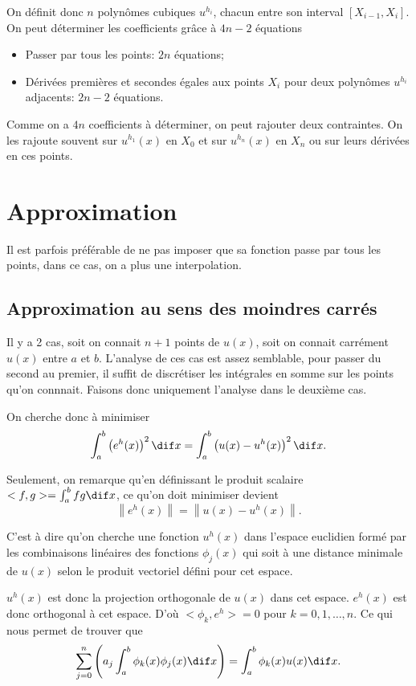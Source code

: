 On définit donc $n$ polynômes cubiques $u^{h_i}$, chacun entre son
interval $[X_{i-1}, X_i]$.
On peut déterminer les coefficients grâce à $4n-2$ équations
\begin{itemize}
  \item Passer par tous les points: $2n$ équations;
  \item Dérivées premières et secondes égales aux points $X_i$
    pour deux polynômes $u^{h_i}$ adjacents: $2n-2$ équations.
\end{itemize}

Comme on a $4n$ coefficients à déterminer, on peut rajouter deux contraintes.
On les rajoute souvent sur $u^{h_1}(x)$ en $X_0$ et sur $u^{h_n}(x)$ en $X_n$
ou sur leurs dérivées en ces points.

\section{Approximation}
Il est parfois préférable de ne pas imposer que sa fonction passe par tous les
points, dans ce cas, on a plus une interpolation.

\subsection{Approximation au sens des moindres carrés}
Il y a 2 cas, soit on connait $n+1$ points de $u(x)$, soit on
connait carrément $u(x)$ entre $a$ et $b$.
L'analyse de ces cas est assez semblable, pour passer du second au premier,
il suffit de discrétiser les intégrales en somme sur les points qu'on connnait.
Faisons donc uniquement l'analyse dans le deuxième cas.

On cherche donc à minimiser
\[ \int_a^b \left(e^h(x)\right)^2 \dif x =
\int_a^b \left(u(x) - u^h(x)\right)^2 \dif x. \]

Seulement, on remarque qu'en définissant le produit scalaire
$<f, g> = \int_a^b fg \dif x$, ce qu'on doit minimiser devient
\[ \left\|e^h(x)\right\| = \left\|u(x) - u^h(x)\right\|. \]

C'est à dire qu'on cherche une fonction $u^h(x)$ dans l'espace euclidien
formé par les combinaisons linéaires des fonctions $\phi_j(x)$ qui soit
à une distance minimale de $u(x)$ selon le produit vectoriel défini pour
cet espace.

$u^h(x)$ est donc la projection orthogonale de $u(x)$ dans cet espace.
$e^h(x)$ est donc orthogonal à cet espace.
D'où $<\phi_k, e^h> = 0$ pour $k = 0, 1, \ldots, n$.
Ce qui nous permet de trouver que
\[ \sum_{j=0}^n \left(a_j \int_a^b \phi_k(x) \phi_j(x) \dif x\right)
= \int_a^b \phi_k(x) u(x) \dif x. \]


